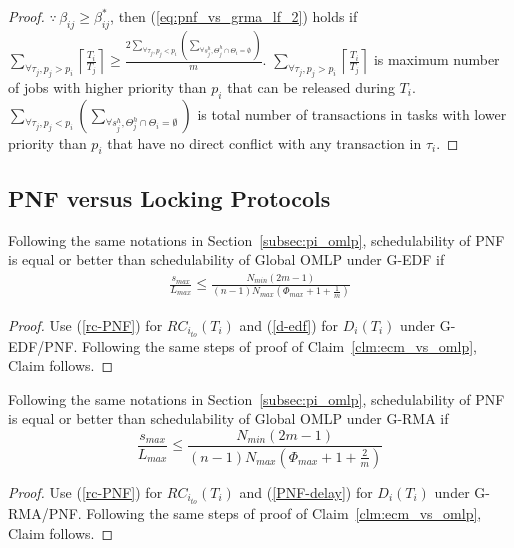 \begin{proof}
%
$\because\,\beta_{ij}\ge\beta_{ij}^{*}$, then (\ref{eq:pnf_vs_grma_lf_2})
holds if $\sum_{\forall\tau_{j},p_{j}>p_{i}}\left\lceil \frac{T_{i}}{T_{j}}\right\rceil \ge\frac{2\sum_{\forall\tau_{j},p_{j}<p_{i}}\left(\sum_{\forall s_{j}^{h},\Theta_{j}^{h}\cap\Theta_{i}=\emptyset}\right)}{m}$.
$\sum_{\forall\tau_{j},p_{j}>p_{i}}\left\lceil \frac{T_{i}}{T_{j}}\right\rceil $
is maximum number of jobs with higher priority than $p_{i}$ that
can be released during $T_{i}$. $\sum_{\forall\tau_{j},p_{j}<p_{i}}\left(\sum_{\forall s_{j}^{h},\Theta_{j}^{h}\cap\Theta_{i}=\emptyset}\right)$
is total number of transactions in tasks with lower priority than
$p_{i}$ that have no direct conflict with any transaction in $\tau_{i}$.
%
\end{proof}
%
\subsection{PNF versus Locking Protocols}\label{subsec:pnf_vs_locking_comp}
%
\begin{clm}\label{clm:gedf_pnf_vs_omlp}
%
Following the same notations in Section~\ref{subsec:pi_omlp}, schedulability of PNF is equal or better than schedulability of Global OMLP under G-EDF if 
%
\begin{eqnarray}
%
\frac{s_{max}}{L_{max}} \le \frac{N_{min}\left(2m-1\right)}{\left(n-1\right)N_{max}\left(\Phi_{max}+1+\frac{1}{m}\right)}
\label{eq:gedf_pnf_omlp_cmp_final}
%
\end{eqnarray}
%
\end{clm}
%
\begin{proof}
%
Use (\ref{rc-PNF}) for $RC_{i_{to}}(T_i)$ and (\ref{d-edf}) for $D_i(T_i)$ under G-EDF/PNF. Following the same steps of proof of Claim~\ref{clm:ecm_vs_omlp}, Claim follows.
%
\end{proof}
%
\begin{clm}\label{clm:grma_pnf_vs_omlp}
%
Following the same notations in Section~\ref{subsec:pi_omlp}, schedulability of PNF is equal or better than schedulability of Global OMLP under G-RMA if 
%
\begin{equation}
\frac{s_{max}}{L_{max}}\le\frac{N_{min}\left(2m-1\right)}{\left(n-1\right)N_{max}\left(\Phi_{max}+1+\frac{2}{m}\right)}
\label{eq:grma_pnf_omlp_cmp_final}
\end{equation}
%
\end{clm}
%
\begin{proof}
%
Use (\ref{rc-PNF}) for $RC_{i_{to}}(T_i)$ and (\ref{PNF-delay}) for $D_i(T_i)$ under G-RMA/PNF. Following the same steps of proof of Claim~\ref{clm:ecm_vs_omlp}, Claim follows.
%
\end{proof}
